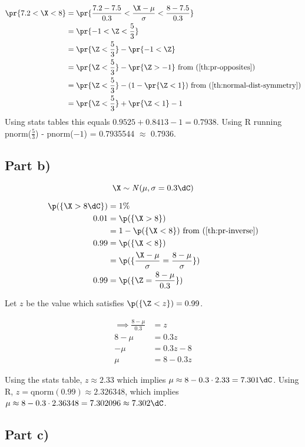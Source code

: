 \begin{align*}
\pr{7.2 < \X < 8} &= \pr{\frac{7.2 - 7.5}{0.3} < \frac{\X - \mu}{\sigma} < \frac{8 - 7.5}{0.3}} \\
&= \pr{-1 < \Z < \frac{5}{3}} \\
&= \pr{\Z < \frac{5}{3}} - \pr{-1 < \Z} \\
&= \pr{\Z < \frac{5}{3}} - \pr{\Z > -1}
\text{	from (\ref{th:pr-opposites})} \\
&= \pr{\Z < \frac{5}{3}} - (1 - \pr{\Z < 1})
\text{	from (\ref{th:normal-dist-symmetry})} \\
&= \pr{\Z < \frac{5}{3}} + \pr{\Z < 1} - 1
\end{align*}
Using stats tables this equals $0.9525 + 0.8413 - 1 = 0.7938$.
Using R running pnorm($\frac{5}{3}$) - pnorm($-1$) = 0.7935544 $\approx$ 0.7936.

\subsection*{Part b)}

\[
\X \sim \mathit{N}(\mu, \sigma = 0.3 \dC)
\]

\begin{align*}
\p(\{ \X > 8\dC \}) &= 1\% \\
0.01 &= \p(\{ \X > 8 \}) \\
&= 1 - \p(\{ \X < 8 \})
\text{	from (\ref{th:pr-inverse})} \\
0.99 &= \p(\{ \X < 8 \}) \\
&= \p(\{ \frac{\X - \mu}{\sigma} = \frac{8 - \mu}{\sigma}\}) \\
0.99 &= \p(\{ \Z = \frac{8 - \mu}{0.3}\}) \\
\end{align*}

Let $z$ be the value which satisfies $\p(\{ \Z < z \}) = 0.99$.

\begin{align*}
\implies \frac{8 - \mu}{0.3} &= z \\
8 - \mu &= 0.3z \\
-\mu &= 0.3z - 8 \\
\mu &= 8 - 0.3z
\end{align*}

Using the stats table, $z \approx 2.33$ which implies $\mu \approx 8 - 0.3 \cdot 2.33 = 7.301\dC$.
Using R, $z = \text{qnorm}(0.99) \approx 2.326348$, which implies $\mu \approx 8 - 0.3 \cdot 2.36348 = 7.302096 \approx 7.302\dC$.

\subsection*{Part c)}

